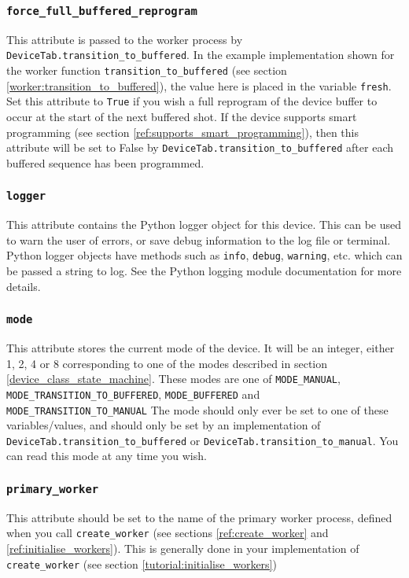 \documentclass[12pt]{article}
\begin{document}
\subsubsection{\texttt{force\_full\_buffered\_reprogram}}\label{ref:force_full_buffered_reprogram}
This attribute is passed to the worker process by \texttt{DeviceTab.transition\_to\_buffered}.
In the example implementation shown for the worker function \texttt{transition\_to\_buffered} (see section \ref{worker:transition_to_buffered}), the value here is placed in the variable \texttt{fresh}.
Set this attribute to \texttt{True} if you wish a full reprogram of the device buffer to occur at the start of the next buffered shot.
If the device supports smart programming (see section \ref{ref:supports_smart_programming}), then this attribute will be set to False by \texttt{DeviceTab.transition\_to\_buffered} after each buffered sequence has been programmed.

\subsubsection{\texttt{logger}}\label{ref:logger}
This attribute contains the Python logger object for this device.
This can be used to warn the user of errors, or save debug information to the log file or terminal. 
Python logger objects have methods such as \texttt{info}, \texttt{debug}, \texttt{warning}, etc. which can be passed a string to log.
See the Python logging module documentation for more details.

\subsubsection{\texttt{mode}}\label{ref:mode}
This attribute stores the current mode of the device. 
It will be an integer, either 1, 2, 4 or 8 corresponding to one of the modes described in section \ref{device_class_state_machine}.
These modes are one of \texttt{MODE\_MANUAL}, \texttt{MODE\_TRANSITION\_TO\_BUFFERED}, \texttt{MODE\_BUFFERED} and \texttt{MODE\_TRANSITION\_TO\_MANUAL}
The mode should only ever be set to one of these variables/values, and should only be set by an implementation of \texttt{DeviceTab.transition\_to\_buffered} or \texttt{DeviceTab.transition\_to\_manual}.
You can read this mode at any time you wish.

\subsubsection{\texttt{primary\_worker}}\label{ref:primary_worker}
This attribute should be set to the name of the primary worker process, defined when you call \texttt{create\_worker} (see sections \ref{ref:create_worker} and \ref{ref:initialise_workers}).
This is generally done in your implementation of \texttt{create\_worker} (see section \ref{tutorial:initialise_workers})
\end{document}
